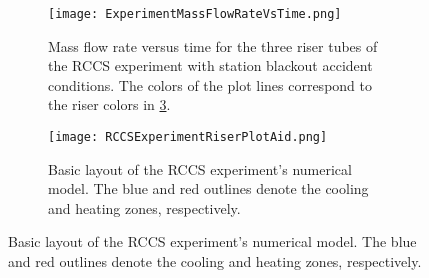 \begin{figure}%
    \centering
    \begin{subfigure}[t]{\textwidth}
        \caption[ Mass flow rate versus time for the three riser tubes]{   
            Mass flow rate versus time for the three riser tubes of the RCCS experiment with station blackout accident conditions. 
            The colors of the plot lines correspond to the riser colors in \cref{Figure:RCCSExperimentRiserPlotAid}.}%
        \label{Figure:ExperimentMassFlowRateVsTime}%
        \texttt{[image: ExperimentMassFlowRateVsTime.png]}
    \end{subfigure}
    \begin{subfigure}[t]{\textwidth}
        \caption[Basic layout of the RCCS experiment]{Basic layout of the RCCS experiment's numerical model.
                 The blue and red outlines denote the cooling and heating zones, respectively.}%
        \label{Figure:RCCSExperimentRiserPlotAid}%
        \texttt{[image: RCCSExperimentRiserPlotAid.png]}%
    \end{subfigure}
\end{figure}
